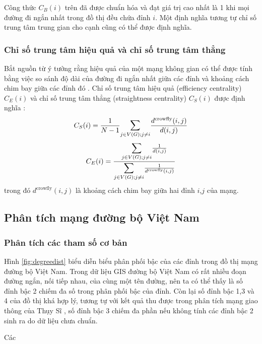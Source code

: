 \documentclass[14pt, oneside, a4paper, openany]{scrartcl}
\begin{document}
Công thức $C_B(i)$ trên đã được chuẩn hóa và đạt giá trị cao nhất là 1 khi mọi đường đi ngắn nhất trong đồ thị đều chứa đỉnh $i$. Một định nghĩa tương tự chỉ số trung tâm trung gian cho cạnh cũng có thể được định nghĩa.

\subsubsection{Chỉ số trung tâm hiệu quả và chỉ số trung tâm thẳng}
Bắt nguồn từ ý tưởng rằng hiệu quả của một mạng không gian có thể được tính bằng việc so sánh độ dài của đường đi ngắn nhất giữa các đỉnh và khoảng cách chim bay giữa các đỉnh đó \cite{efficiency01}. Chỉ số trung tâm hiệu quả (efficiency centrality) $C_E(i)$ và chỉ số trung tâm thẳng (straightness centrality) $C_S(i)$ được định nghĩa \cite{efficiency02}:
\begin{equation}
C_S(i) = \frac{1}{N-1} \mathlarger{\sum}_{j \in V(G); j \neq i} \frac{d^{\text{crowfly}}(i,j)}{d(i,j)}
\end{equation}
\begin{equation}
	C_E(i) = \frac{\mathlarger{\sum}_{j \in V(G); j \neq i}\frac{1}{d(i,j)}}{\mathlarger{\sum}_{j \in V(G); j \neq i}\frac{1}{d^{\text{crowfly}}(i,j)}}
\end{equation}
trong đó $d^{\text{crowfly}}(i,j)$ là khoảng cách chim bay giữa hai đỉnh $i$,$j$ của mạng.

\subsection{Phân tích mạng đường bộ Việt Nam}
\newpage
\subsubsection{Phân tích các tham số cơ bản}
Hình \ref{fig:degreedist} biểu diễn biểu phân phối bậc của các đỉnh trong đồ thị mạng đường bộ Việt Nam. Trong dữ liệu GIS đường bộ Việt Nam có rất nhiều đoạn đường ngắn, nối tiếp nhau, của cùng một tên đường, nên ta có thể thấy là số đỉnh bậc 2 chiếm đa số trong phân phối bậc của đỉnh. Còn lại số đỉnh bậc 1,3 và 4 của đồ thị khá hợp lý, tương tự với kết quả thu được trong phân tích mạng giao thông của Thụy Sĩ \cite{swissroad}, số đỉnh bậc 3 chiếm đa phần nếu không tính các đỉnh bậc 2 sinh ra do dữ liệu chưa chuẩn.

Các 
\end{document}
